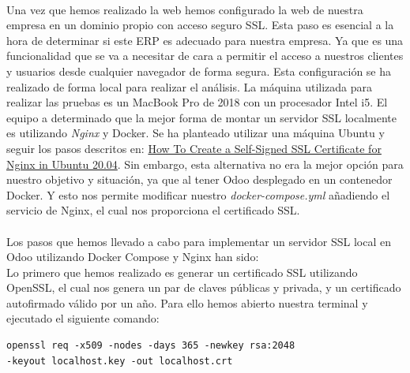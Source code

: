 \paragraph{}
Una vez que hemos realizado la web hemos configurado la web de nuestra empresa en un dominio propio con acceso seguro SSL. Esta paso es esencial a la hora de determinar si este ERP es adecuado para nuestra empresa. Ya que es una funcionalidad que se va a necesitar de cara a permitir el acceso a nuestros clientes y usuarios desde cualquier navegador de forma segura. Esta configuración se ha realizado de forma local para realizar el análisis. La máquina utilizada para realizar las pruebas es un MacBook Pro de 2018 con un procesador Intel i5. El equipo a determinado que la mejor forma de montar un servidor SSL localmente es utilizando \textit{Nginx} y Docker. Se ha planteado utilizar una máquina Ubuntu y seguir los pasos descritos en: \href{https://www.digitalocean.com/community/tutorials/how-to-create-a-self-signed-ssl-certificate-for-nginx-in-ubuntu-20-04-1}{How To Create a Self-Signed SSL Certificate for Nginx in Ubuntu 20.04}. Sin embargo, esta alternativa no era la mejor opción para nuestro objetivo y situación, ya que al tener Odoo desplegado en un contenedor Docker. Y esto nos permite modificar nuestro \textit{docker-compose.yml} añadiendo el servicio de Nginx, el cual nos proporciona el certificado SSL. 

\paragraph{}
Los pasos que hemos llevado a cabo para implementar un servidor SSL local en Odoo utilizando Docker Compose y Nginx han sido:\\
Lo primero que hemos realizado es generar un certificado SSL utilizando OpenSSL, el cual nos genera un par de claves públicas y privada, y un certificado autofirmado válido por un año. Para ello hemos abierto nuestra terminal y ejecutado el siguiente comando:

 \begin{lstlisting}[frame=single, basicstyle=\small]
openssl req -x509 -nodes -days 365 -newkey rsa:2048
-keyout localhost.key -out localhost.crt
\end{lstlisting}

